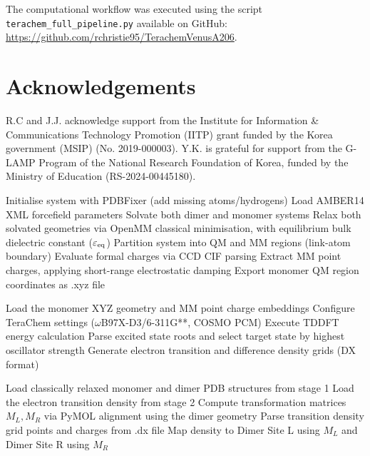 \documentclass[journal=jpclcd, manuscript=letter, layout=twocolumn, doi=true]{achemso}
\begin{document}
The computational workflow was executed using the script \texttt{terachem\_full\_pipeline.py} available on GitHub: \url{https://github.com/rchristie95/TerachemVenusA206}. 

\section{Acknowledgements}
R.C and J.J. acknowledge support from the Institute for Information \& Communications Technology Promotion (IITP) grant funded by the Korea government (MSIP) (No. 2019-000003). Y.K. is grateful for support from the G-LAMP Program of the National Research Foundation of Korea, funded by the Ministry of Education (RS-2024-00445180). 




\begin{algorithm*}[ht]
\caption{Quantum-Classical Hybrid Excitonic Coupling Pipeline \\(\texttt{terachem\_full\_pipeline.py})}
\label{alg:pipeline}
\begin{algorithmic}[1]
    \State {}
    \State {}
    \State {}
\EndProcedure

\vspace{0.2cm}
    \State Initialise system with PDBFixer (add missing atoms/hydrogens)
    \State Load AMBER14 XML forcefield parameters
    \State Solvate both dimer and monomer systems 
    \State Relax both solvated geometries via OpenMM classical minimisation, with equilibrium bulk dielectric constant ($\varepsilon_{\rm eq}$) 
    \State Partition system into QM and MM regions (link-atom boundary)
    \State Evaluate formal charges via CCD CIF parsing
    \State Extract MM point charges, applying short-range electrostatic damping
    \State Export monomer QM region coordinates as .xyz file
\EndProcedure

\vspace{0.2cm}
    \State Load the monomer XYZ geometry and MM point charge embeddings
    \State Configure TeraChem settings ($\omega$B97X-D3/6-311G**, COSMO PCM)
    \State Execute TDDFT energy calculation 
    \State Parse excited state roots and select target state by highest oscillator strength
    \State Generate electron transition and difference density grids (DX format)
\EndProcedure

\vspace{0.2cm}
    \State Load classically relaxed monomer and dimer PDB structures from stage 1
    \State Load the electron transition density from stage 2
    \State Compute transformation matrices $M_L, M_R$ via PyMOL alignment using the dimer geometry 
    \State Parse transition density grid points and charges from .dx file
    \State Map density to Dimer Site L using $M_L$ and Dimer Site R using $M_R$
    \State {}
\EndProcedure


\end{algorithmic}
\end{algorithm*}
\end{document}
